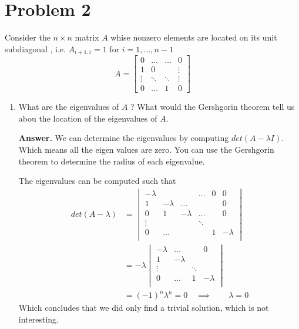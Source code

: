 \documentclass{article}
\theoremstyle{remark}
\newcommand{\newpara}
  {
  \vskip 0.4cm
  }
\begin{document}
\newpage

\section{Problem 2}%
\label{sec:problem_2}

Consider the $n \times n $ matrix $A$ whise nonzero elements are located on its unit subdiagonal , i.e. $A_{i+1, i} = 1$ for $i = 1, \ldots, n-1$\[
A = \begin{bmatrix} 
  0  &  \ldots  &  \ldots  & 0 \\
  1  &  0  &    & \vdots  \\
  \vdots   & \ddots   & \ddots   &  \vdots   \\
  0  &  \ldots     & 1  & 0 
\end{bmatrix} 
\] 

\begin{enumerate}[label=(\alph*)]
  \item  What are the eigenvalues of $A$ ? What would the Gershgorin theorem tell us abou the location of the eigenvalues of $A$.
    \begin{tcolorbox}
      \textbf{Answer.} 
      We can determine the eigenvalues by computing $det\left( A - \lambda I  \right)$.
Which means all the eigen values are zero. You can use the Gershgorin theorem to determine the radius of each eigenvalue.

\newpara
The eigenvalues can be computed such that \[
  \begin{split}
  det \left( A - \lambda   \right) &= \begin{vmatrix} 
  -\lambda &   &   &      \ldots  & 0 & 0 \\
  1  &  -\lambda  & \ldots  &   &   & 0 \\
  0  & 1  & - \lambda   &  \ldots  &   & 0 \\
  \vdots  &   &  &   \ddots  \\
  0  &  \ldots  &  &    & 1    & - \lambda      \\
  \end{vmatrix} 
    \\
   &= -\lambda  \begin{vmatrix} 
   -\lambda   &  \ldots  &      & 0 \\
  1  & - \lambda  &      \\
  \vdots  & &    \ddots  \\
  0  &  \ldots & 1    & -\lambda      \\
  \end{vmatrix} 
    \\
   &=\left( -1 \right)^{n}   \lambda^{n}  = 0 \quad   \implies  \quad \quad \lambda  = 0
  \end{split} 
\] 
Which concludes that we did only find a trivial solution, which is not interesting.


\end{tcolorbox}
\end{enumerate}
\end{document}
